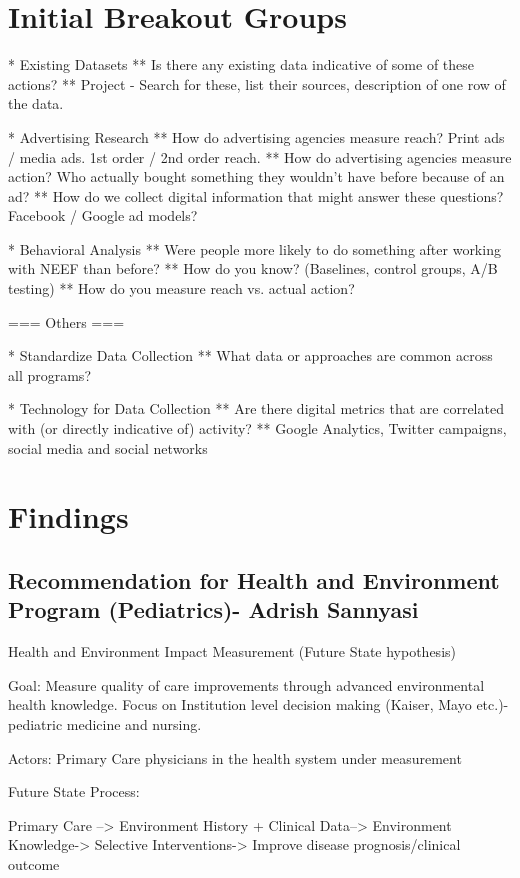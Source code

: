 \documentclass{article}
\begin{document}
\section{Initial Breakout Groups}

* Existing Datasets
** Is there any existing data indicative of some of these actions?
** Project - Search for these, list their sources, description of one row of the data.

* Advertising Research
** How do advertising agencies measure reach?  Print ads / media ads.  1st order / 2nd order reach.
** How do advertising agencies measure action?  Who actually bought something they wouldn't have before because of an ad?
** How do we collect digital information that might answer these questions?  Facebook / Google ad models?

* Behavioral Analysis
** Were people more likely to do something after working with NEEF than before?
** How do you know?  (Baselines, control groups, A/B testing)
** How do you measure reach vs. actual action?

=== Others ===

* Standardize Data Collection
** What data or approaches are common across all programs?

* Technology for Data Collection
** Are there digital metrics that are correlated with (or directly indicative of) activity? 
** Google Analytics, Twitter campaigns, social media and social networks

\section{Findings}
\subsection{Recommendation for Health and Environment Program (Pediatrics)- Adrish Sannyasi}


Health and Environment Impact Measurement (Future State hypothesis)

Goal: Measure quality of care improvements through advanced environmental health knowledge. Focus on Institution level decision making (Kaiser, Mayo etc.)- pediatric medicine and nursing.

Actors: Primary Care physicians in the health system under measurement

Future State Process:

Primary Care --> Environment History + Clinical Data--> Environment Knowledge-> Selective Interventions-> Improve disease prognosis/clinical outcome
\end{document}

